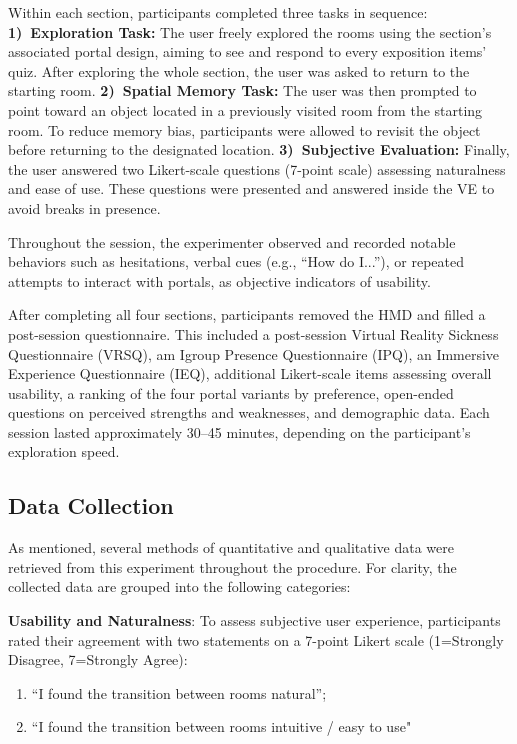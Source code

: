Within each section, participants completed three tasks in sequence:  
\textbf{1)~Exploration Task:} The user freely explored the rooms using the section's associated portal design, aiming to see and respond 
to every exposition items' quiz. After exploring the whole section, the user was asked to return to the starting room.  
\textbf{2)~Spatial Memory Task:} The user was then prompted to point toward an object located in a previously visited room from the starting room. 
To reduce memory bias, participants were allowed to revisit the object before returning to the designated location.  
\textbf{3)~Subjective Evaluation:} Finally, the user answered two Likert-scale questions (7-point scale) assessing naturalness and ease 
of use. These questions were presented and answered inside the \gls{VE} to avoid breaks in presence.  

Throughout the session, the experimenter observed and recorded notable behaviors such as hesitations, verbal cues (e.g., “How do I...”), 
or repeated attempts to interact with portals, as objective indicators of usability.  

After completing all four sections, participants removed the \gls{HMD} and filled a post-session questionnaire. This included a post-session 
Virtual Reality Sickness Questionnaire (VRSQ), am Igroup Presence Questionnaire (IPQ), an Immersive Experience Questionnaire (IEQ), 
additional Likert-scale items assessing overall usability, a ranking of the four portal variants by preference, open-ended questions on perceived 
strengths and weaknesses, and demographic data. Each session lasted approximately 30–45 minutes, depending on the participant's exploration speed.


\subsection{Data Collection}
\label{sec:data}

As mentioned, several methods of quantitative and qualitative data were retrieved from this experiment throughout the procedure.  
For clarity, the collected data are grouped into the following categories:

\textbf{Usability and Naturalness}: To assess subjective user experience, participants rated their agreement with two statements on a 7-point Likert scale (1=Strongly Disagree, 7=Strongly Agree): 

\begin{enumerate}
    \item “I found the transition between rooms natural”;
    \item “I found the transition between rooms intuitive / easy to use"
\end{enumerate}

